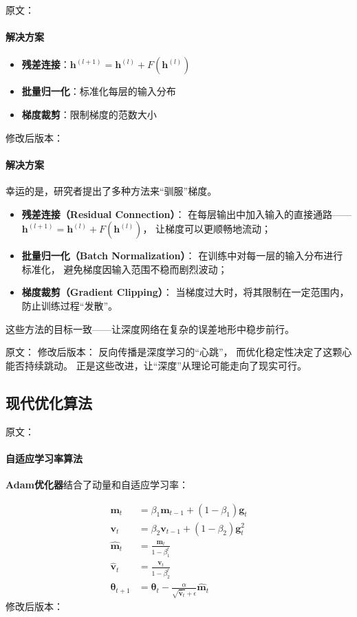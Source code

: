 原文：
\paragraph{解决方案}
\begin{itemize}
\item \textbf{残差连接}：$\mathbf{h}^{(l+1)} = \mathbf{h}^{(l)} + F(\mathbf{h}^{(l)})$
\item \textbf{批量归一化}：标准化每层的输入分布
\item \textbf{梯度裁剪}：限制梯度的范数大小
\end{itemize}
修改后版本：
\paragraph{解决方案}  
幸运的是，研究者提出了多种方法来“驯服”梯度。  

\begin{itemize}
\item \textbf{残差连接（Residual Connection）}：  
在每层输出中加入输入的直接通路——$\mathbf{h}^{(l+1)} = \mathbf{h}^{(l)} + F(\mathbf{h}^{(l)})$，  
让梯度可以更顺畅地流动；
\item \textbf{批量归一化（Batch Normalization）}：  
在训练中对每一层的输入分布进行标准化，  
避免梯度因输入范围不稳而剧烈波动；
\item \textbf{梯度裁剪（Gradient Clipping）}：  
当梯度过大时，将其限制在一定范围内，  
防止训练过程“发散”。
\end{itemize}

这些方法的目标一致——让深度网络在复杂的误差地形中稳步前行。



原文：
修改后版本：
反向传播是深度学习的“心跳”，  
而优化稳定性决定了这颗心能否持续跳动。  
正是这些改进，让“深度”从理论可能走向了现实可行。

\subsection{现代优化算法}

原文：
\paragraph{自适应学习率算法}

\textbf{Adam优化器}结合了动量和自适应学习率：

\begin{align}
\mathbf{m}_t &= \beta_1 \mathbf{m}_{t-1} + (1-\beta_1) \mathbf{g}_t \\
\mathbf{v}_t &= \beta_2 \mathbf{v}_{t-1} + (1-\beta_2) \mathbf{g}_t^2 \\
\hat{\mathbf{m}}_t &= \frac{\mathbf{m}_t}{1-\beta_1^t} \\
\hat{\mathbf{v}}_t &= \frac{\mathbf{v}_t}{1-\beta_2^t} \\
\boldsymbol{\theta}_{t+1} &= \boldsymbol{\theta}_t - \frac{\alpha}{\sqrt{\hat{\mathbf{v}}_t} + \epsilon} \hat{\mathbf{m}}_t
\end{align}
修改后版本：
